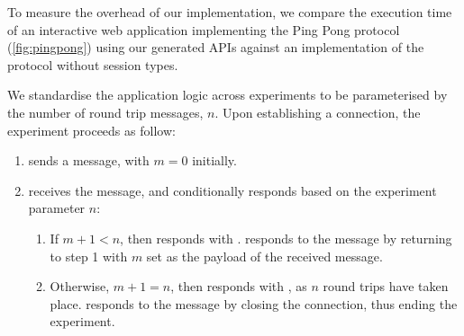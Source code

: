 To measure the overhead of our implementation, we compare the
execution time of an interactive web application implementing the
Ping Pong protocol (\cref{fig:pingpong}) using our generated APIs
against an implementation of the protocol without session types.

We standardise the application logic across experiments to be 
parameterised by the number of round trip messages, $n$.
Upon establishing a connection, the experiment proceeds as follow:

\begin{enumerate}

\item {} sends a  message, 
with $m = 0$ initially.

\item {} receives the  message, and
conditionally responds based on the experiment parameter $n$:

\begin{enumerate}
\item If $m + 1 < n$, then  responds with .
 responds to the  message by returning to
step 1 with $m$ set as the payload of the received  message.

\item Otherwise, $m + 1 = n$, then  responds with 
, as $n$ round trips have taken place. 
 responds to the
 message by closing the connection, thus ending the experiment.
\end{enumerate}

\end{enumerate}


